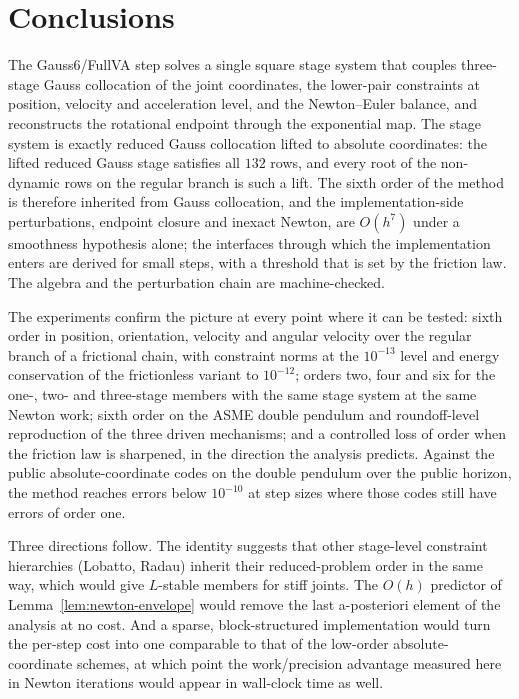 \documentclass[preprint,12pt]{elsarticle}
\newcommand{\method}{Gauss6\slash FullVA}
\begin{document}
\section{Conclusions}
\label{sec:conclusions}

The \method{} step solves a single square stage system that couples three-stage Gauss collocation
of the joint coordinates, the lower-pair constraints at position, velocity and acceleration level,
and the Newton--Euler balance, and reconstructs the rotational endpoint through the exponential
map. The stage system is exactly reduced Gauss collocation lifted to absolute coordinates: the
lifted reduced Gauss stage satisfies all $132$ rows, and every root of the non-dynamic rows on the
regular branch is such a lift. The sixth order of the method is therefore inherited from Gauss
collocation, and the implementation-side perturbations, endpoint closure and inexact Newton, are
$O(h^7)$ under a smoothness hypothesis alone; the interfaces through which the implementation enters
are derived for small steps, with a threshold that is set by the friction law. The algebra and the
perturbation chain are machine-checked.

The experiments confirm the picture at every point where it can be tested: sixth order in position,
orientation, velocity and angular velocity over the regular branch of a frictional chain, with
constraint norms at the $10^{-13}$ level and energy conservation of the frictionless variant to
$10^{-12}$; orders two, four and six for the one-, two- and three-stage members with the same
stage system at the same Newton work; sixth order on the ASME double pendulum and roundoff-level
reproduction of the three driven mechanisms; and a controlled loss of order when the friction law is
sharpened, in the direction the analysis predicts. Against the public absolute-coordinate codes on
the double pendulum over the public horizon, the method reaches errors below $10^{-10}$ at step
sizes where those codes still have errors of order one.

Three directions follow. The identity suggests that other stage-level constraint hierarchies
(Lobatto, Radau) inherit their reduced-problem order in the same way, which would give
$L$-stable members for stiff joints. The $O(h)$ predictor of Lemma~\ref{lem:newton-envelope}
would remove the last a-posteriori element of the analysis at no cost. And a sparse, block-structured
implementation would turn the per-step cost into one comparable to that of the low-order
absolute-coordinate schemes, at which point the work/precision advantage measured here in Newton
iterations would appear in wall-clock time as well.
\end{document}
